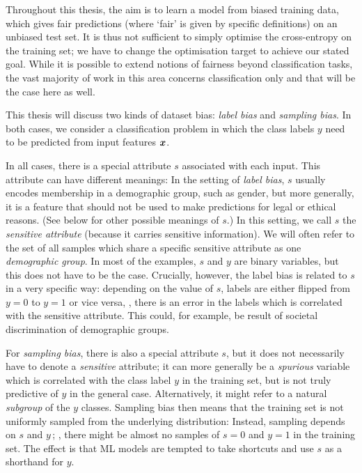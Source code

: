 
Throughout this thesis, the aim is to learn a model from biased training data,
which gives fair predictions (where `fair' is given by specific definitions) on an unbiased test set.
It is thus not sufficient to simply optimise the cross-entropy on the training set;
we have to change the optimisation target to achieve our stated goal.
While it is possible to extend notions of fairness beyond classification tasks,
the vast majority of work in this area concerns classification only and that will be the case here as well.

This thesis will discuss two kinds of dataset bias: \emph{label bias} and \emph{sampling bias}.
In both cases,
we consider a classification problem in which the class labels $y$ need to be predicted from input features ${\bm{x}}$.

In all cases, there is a special attribute $s$ associated with each input.
This attribute can have different meanings:
In the setting of \emph{label bias}, $s$ usually encodes membership in a demographic group, such as gender,
but more generally, it is a feature that should not be used to make predictions for legal or ethical reasons.
(See below for other possible meanings of $s$.)
In this setting, we call $s$ the \emph{sensitive attribute} (because it carries sensitive information).
We will often refer to the set of all samples which share a specific sensitive attribute as one \emph{demographic group}.
In most of the examples, $s$ and $y$ are binary variables, but this does not have to be the case.
Crucially, however, the label bias is related to $s$ in a very specific way:
depending on the value of $s$, labels are either flipped from $y=0$ to $y=1$ or vice versa,
\ie, there is an error in the labels which is correlated with the sensitive attribute.
This could, for example, be result of societal discrimination of demographic groups.

For \emph{sampling bias},
there is also a special attribute $s$, but it does not necessarily have to denote a \emph{sensitive} attribute;
it can more generally be a \emph{spurious} variable which is correlated with the class label $y$ in the training set,
but is not truly predictive of $y$ in the general case.
Alternatively, it might refer to a natural \emph{subgroup} of the $y$ classes.
Sampling bias then means that the training set is not uniformly sampled from the underlying distribution:
Instead, sampling depends on $s$ and $y\,$;
\eg, there might be almost no samples of $s=0$ and $y=1$ in the training set.
The effect is that \ac{ML} models are tempted to take shortcuts and use $s$ as a shorthand for $y$.

